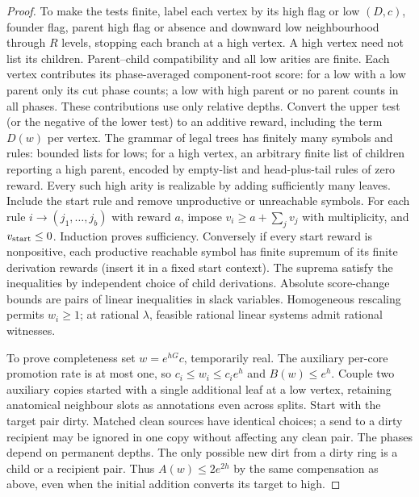 \documentclass[11pt]{article}
\theoremstyle{remark}
\numberwithin{equation}{section}
\begin{document}
\begin{proof}
To make the tests finite, label each vertex by its high flag or low $(D,c)$, founder flag, parent high flag or absence and downward low neighbourhood through $R$ levels, stopping each branch at a high vertex. A high vertex need not list its children. Parent--child compatibility and all low arities are finite. Each vertex contributes its phase-averaged component-root score: for a low with a low parent only its cut phase counts; a low with high parent or no parent counts in all phases. These contributions use only relative depths. Convert the upper test (or the negative of the lower test) to an additive reward, including the term $D(w)$ per vertex. The grammar of legal trees has finitely many symbols and rules: bounded lists for lows; for a high vertex, an arbitrary finite list of children reporting a high parent, encoded by empty-list and head-plus-tail rules of zero reward. Every such high arity is realizable by adding sufficiently many leaves. Include the start rule and remove unproductive or unreachable symbols. For each rule $i\to(j_1,\ldots,j_b)$ with reward $a$, impose $v_i\ge a+\sum_j v_{j}$ with multiplicity, and $v_{\rm start}\le0$. Induction proves sufficiency. Conversely if every start reward is nonpositive, each productive reachable symbol has finite supremum of its finite derivation rewards (insert it in a fixed start context). The suprema satisfy the inequalities by independent choice of child derivations. Absolute score-change bounds are pairs of linear inequalities in slack variables. Homogeneous rescaling permits $w_i\ge1$; at rational $\lambda$, feasible rational linear systems admit rational witnesses.

To prove completeness set $w=e^{hG}c$, temporarily real. The auxiliary per-core promotion rate is at most one, so $c_i\le w_i\le c_i e^h$ and $B(w)\le e^h$. Couple two auxiliary copies started with a single additional leaf at a low vertex, retaining anatomical neighbour slots as annotations even across splits. Start with the target pair dirty. Matched clean sources have identical choices; a send to a dirty recipient may be ignored in one copy without affecting any clean pair. The phases depend on permanent depths. The only possible new dirt from a dirty ring is a child or a recipient pair. Thus $A(w)\le2e^{2h}$ by the same compensation as above, even when the initial addition converts its target to high.


\end{proof}
\end{document}
